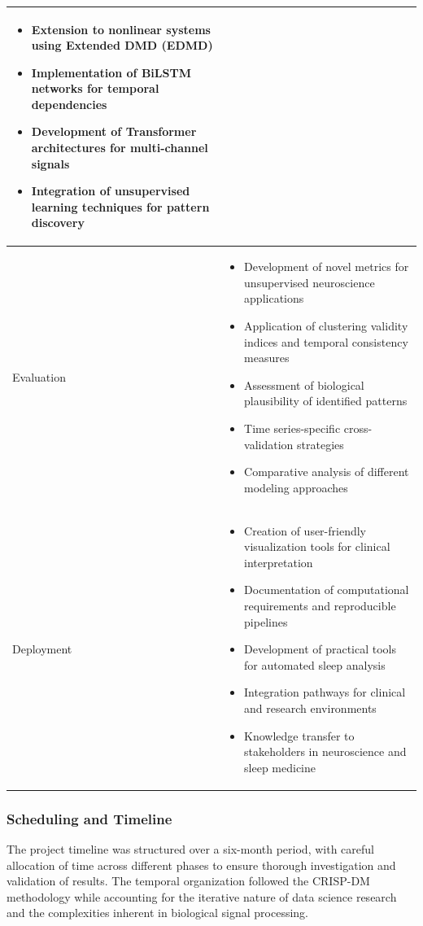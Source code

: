\documentclass[a4paper,12pt,twoside]{article}
\begin{document}
\begin{table}[H]
\begin{tabular}{|p{3cm}|p{11cm}|}
\begin{itemize}
  \item Extension to nonlinear systems using Extended DMD (EDMD)
  \item Implementation of BiLSTM networks for temporal dependencies
  \item Development of Transformer architectures for multi-channel signals
  \item Integration of unsupervised learning techniques for pattern discovery
\end{itemize} \\
\hline
Evaluation & 
\begin{itemize}
  \item Development of novel metrics for unsupervised neuroscience applications
  \item Application of clustering validity indices and temporal consistency measures
  \item Assessment of biological plausibility of identified patterns
  \item Time series-specific cross-validation strategies
  \item Comparative analysis of different modeling approaches
\end{itemize} \\
\hline
Deployment & 
\begin{itemize}
  \item Creation of user-friendly visualization tools for clinical interpretation
  \item Documentation of computational requirements and reproducible pipelines
  \item Development of practical tools for automated sleep analysis
  \item Integration pathways for clinical and research environments
  \item Knowledge transfer to stakeholders in neuroscience and sleep medicine
\end{itemize} \\
\hline
\end{tabular}
\label{tab:crisp_dm_implementation}
\end{table}

\subsubsection{Scheduling and Timeline}

The project timeline was structured over a six-month period, with careful allocation of time across different phases to ensure thorough investigation and validation of results. The temporal organization followed the CRISP-DM methodology while accounting for the iterative nature of data science research and the complexities inherent in biological signal processing.
\end{document}
